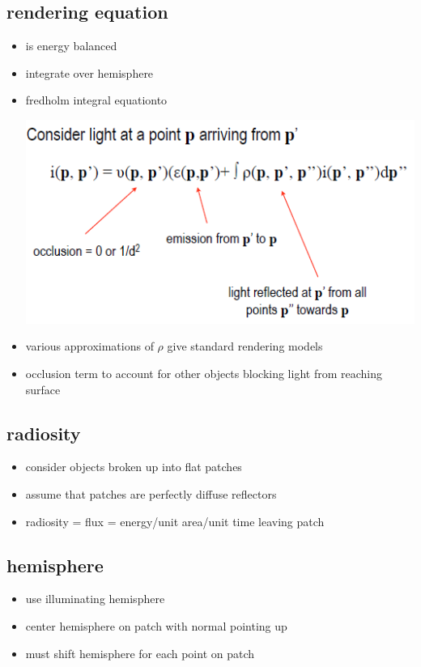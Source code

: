 \documentclass[11pt,a4paper]{article}
\begin{document}
\subsection{rendering equation}
\begin{itemize}
	\item is energy balanced
	\item integrate over hemisphere
	\item fredholm integral equationto
	\begin{center}
		\includegraphics[scale=0.7]{pictures/rendering_equation.PNG}
	\end{center}
	\item various approximations of $\rho$ give standard rendering models
	\item occlusion term to account for other objects blocking light from reaching surface
\end{itemize}
\subsection{radiosity}
\begin{itemize}
	\item consider objects broken up into flat patches
	\item assume that patches are perfectly diffuse reflectors
	\item radiosity = flux = energy/unit area/unit time leaving patch
\end{itemize}
\subsection{hemisphere}
\begin{itemize}
	\item use illuminating hemisphere
	\item center hemisphere on patch with normal pointing up
	\item must shift hemisphere for each point on patch
\end{itemize}
\end{document}
